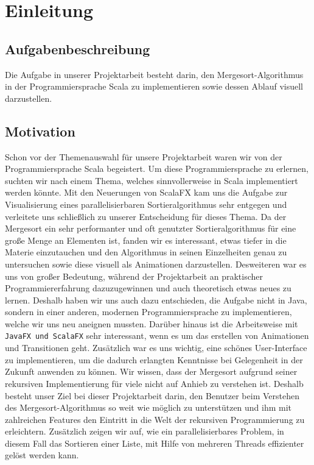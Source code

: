 \chapter{Einleitung}\label{chap:intro}
\section{Aufgabenbeschreibung}
Die Aufgabe in unserer Projektarbeit besteht darin, den Mergesort-Algorithmus in der Programmiersprache Scala zu implementieren sowie dessen Ablauf visuell darzustellen.
\section{Motivation}
Schon vor der Themenauswahl für unsere Projektarbeit waren wir von der Programmiersprache Scala begeistert. Um diese Programmiersprache zu erlernen, suchten wir nach einem Thema, welches sinnvollerweise in Scala implementiert werden könnte. Mit den Neuerungen von ScalaFX kam uns die Aufgabe zur Visualisierung eines parallelisierbaren Sortieralgorithmus sehr entgegen und verleitete uns schließlich zu unserer Entscheidung für dieses Thema. Da der Mergesort ein sehr performanter und oft genutzter Sortieralgorithmus für eine große Menge an Elementen ist, fanden wir es interessant, etwas tiefer in die Materie einzutauchen und den Algorithmus in seinen Einzelheiten genau zu untersuchen sowie diese visuell als Animationen darzustellen. Desweiteren war es uns von großer Bedeutung, während der Projektarbeit an praktischer Programmiererfahrung dazuzugewinnen und auch theoretisch etwas neues zu lernen. Deshalb haben wir uns auch dazu entschieden, die Aufgabe nicht in Java, sondern in einer anderen, modernen Programmiersprache zu implementieren, welche wir uns neu aneignen mussten. Darüber hinaus ist die Arbeitsweise mit \texttt{JavaFX und ScalaFX} sehr interessant, wenn es um das erstellen von Animationen und Transitionen geht. Zusätzlich war es uns wichtig, eine schönes User-Interface zu implementieren, um die dadurch erlangten Kenntnisse bei Gelegenheit in der Zukunft anwenden zu können. Wir wissen, dass der Mergesort aufgrund seiner rekursiven Implementierung für viele nicht auf Anhieb zu verstehen ist. Deshalb besteht unser Ziel bei dieser Projektarbeit darin, den Benutzer beim Verstehen des Mergesort-Algorithmus so weit wie möglich zu unterstützen und ihm mit zahlreichen Features den Eintritt in die Welt der rekursiven Programmierung zu erleichtern. Zusätzlich zeigen wir auf, wie ein parallelisierbares Problem, in diesem Fall das Sortieren einer Liste, mit Hilfe von mehreren Threads effizienter gelöst werden kann.

